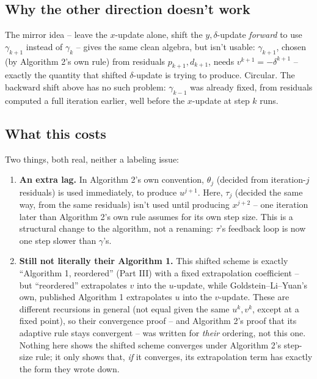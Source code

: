 \documentclass[11pt]{article}
\begin{document}
\subsection*{Why the other direction doesn't work}
The mirror idea -- leave the $x$-update alone, shift the $y,\delta$-update
\emph{forward} to use $\gamma_{k+1}$ instead of $\gamma_k$ -- gives the same clean
algebra, but isn't usable: $\gamma_{k+1}$, chosen (by Algorithm 2's own rule) from
residuals $p_{k+1},d_{k+1}$, needs $v^{k+1}=-\delta^{k+1}$ -- exactly the quantity that
shifted $\delta$-update is trying to produce. Circular. The backward shift above has no
such problem: $\gamma_{k-1}$ was already fixed, from residuals computed a full
iteration earlier, well before the $x$-update at step $k$ runs.

\subsection*{What this costs}
Two things, both real, neither a labeling issue:
\begin{enumerate}
\item \textbf{An extra lag.} In Algorithm 2's own convention, $\theta_j$ (decided from
iteration-$j$ residuals) is used immediately, to produce $u^{j+1}$. Here, $\tau_j$
(decided the same way, from the same residuals) isn't used until producing $x^{j+2}$ --
one iteration later than Algorithm 2's own rule assumes for its own step size. This is
a structural change to the algorithm, not a renaming: $\tau$'s feedback loop is now one
step slower than $\gamma$'s.
\item \textbf{Still not literally their Algorithm 1.} This shifted scheme is exactly
``Algorithm 1, reordered'' (Part III) with a fixed extrapolation coefficient --
but ``reordered'' extrapolates $v$ into the $u$-update, while Goldstein--Li--Yuan's own,
published Algorithm 1 extrapolates $u$ into the $v$-update. These are different
recursions in general (not equal given the same $u^k,v^k$, except at a fixed point), so
their convergence proof -- and Algorithm 2's proof that its adaptive rule stays
convergent -- was written for \emph{their} ordering, not this one. Nothing here shows
the shifted scheme converges under Algorithm 2's step-size rule; it only shows that,
\emph{if} it converges, its extrapolation term has exactly the form they wrote down.
\end{enumerate}
\end{document}
